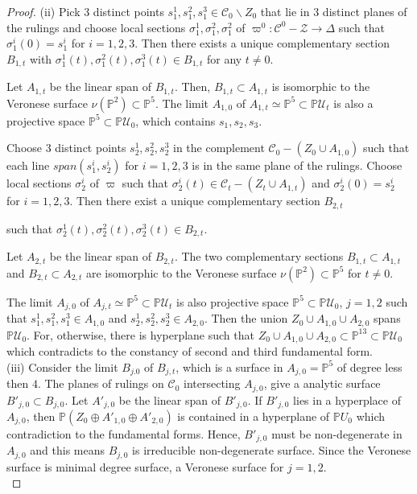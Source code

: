 \documentclass[12pt]{amsart}
\theoremstyle{plain}
\theoremstyle{definition}
\begin{document}
\begin{proof}
(ii) Pick 3 distinct points $s_1^1, s_1^2, s_1^3 \in \mathcal C_0 \backslash Z_0$ that lie  in 3 distinct planes of  the rulings and choose local sections $\sigma^1_1, \sigma^2_1, \sigma^2_1$ of $\varpi^0:\mathcal C^0 -\mathcal Z \rightarrow \Delta$ such that $\sigma^i_1(0)=s_1^i$ for $i=1, 2, 3$. Then there exists a unique complementary section $B_{1,t} $
with $\sigma^1_1(t), \sigma^2_1(t), \sigma^3_1(t) \in B_{1,t}$  for any $t \not=0$.

Let  $A_{1,t}$ be the linear span of $B_{1,t}$.
Then,   $B_{1,t} \subset A_{1,t}$ is isomorphic to the Veronese surface $\nu(\mathbb P^2) \subset \mathbb P^5$. The limit $A_{1,0}$ of $A_{1,t}\simeq \mathbb P^5 \subset \mathbb P \mathcal U_t$ is  also a projective space  $  \mathbb P^5 \subset \mathbb P \mathcal U_0$, which contains $s_1, s_2, s_3  $.

Choose 3 distinct points  $s^1_2, s^2_2, s^3_2 $ in the complement $\mathcal C_0 - (Z_0 \cup A_{1,0})$ such that  each line $span(s^i_1, s^i_2)$ for $i=1,2,3$ is in the same  plane of the rulings. Choose local sections $\sigma^i_2$ of $\varpi$ such that $\sigma^i_2(t) \in \mathcal C_t  - (Z_t \cup  A_{1,t})$ and $\sigma^i_2(0)=s_2^i$ for $i=1, 2, 3$. Then there exist a  unique complementary section $B_{2,t} $

 such that $\sigma^1_2(t), \sigma^2_2(t), \sigma^3_2(t) \in B_{2,t}$.

 Let  $A_{2,t}$ be the linear span of $B_{2,t}$. %
 The two complementary sections $B_{1,t} \subset A_{1,t}$ and $B_{2,t} \subset A_{2,t}$ are isomorphic to the Veronese surface $\nu(\mathbb P^2) \subset \mathbb P^5$ for $t \not=0$.

 The limit $A_{j,0}$ of $A_{j,t}\simeq \mathbb P^5 \subset \mathbb P \mathcal U_t$  is also projective space $ \mathbb P^5 \subset \mathbb P \mathcal U_0$, $j=1, 2$ such that $s^1_1, s^2_1, s^3_1 \in A_{1,0}$ and $s^1_2, s^2_2, s^3_2 \in A_{2,0}$.
 Then the union $Z_0 \cup A_{1,0} \cup A_{2,0}$ spans $\mathbb P \mathcal U_0$. For, otherwise, there is hyperplane such that $Z_0 \cup A_{1,0}  \cup A_{2,0} \subset \mathbb P^{13} \subset \mathbb P \mathcal U_0$ which contradicts to the constancy of second and third fundamental form. \\

(iii) Consider the limit $B_{j.0}$ of $B_{j,t}$, which is a surface in $A_{j,0}=\mathbb P^5$ of degree less then $4$. The planes of rulings on $\mathcal C_0$ intersecting $A_{j,0}$, give  a analytic surface $B'_{j,0} \subset B_{j,0}$. Let $A'_{j,0}$ be the linear span of $B'_{j,0}$. If $B'_{j,0}$ lies in a hyperplace of $A_{j,0}$, then $\mathbb P (Z_0 \oplus A'_{1,0}\oplus A'_{2,0})$ is contained in a hyperplane of $\mathbb P U_0$ which contradiction to the fundamental forms. Hence, $B'_{j,0}$ must be non-degenerate in $A_{j,0}$ and this means $B_{j,0}$ is irreducible non-degenerate surface. Since the Veronese surface is minimal degree surface, a Veronese surface for $j=1,2$. \\


\end{proof}
\end{document}
